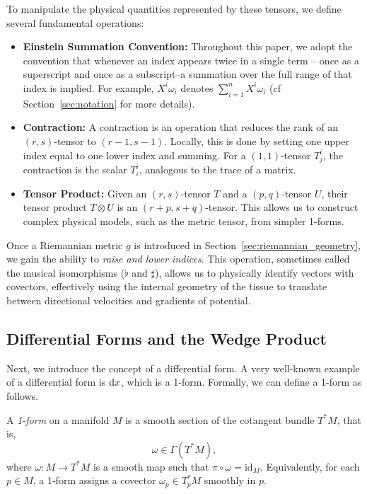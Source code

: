 To manipulate the physical quantities represented by these tensors, we define several fundamental operations:

\begin{itemize}
  \item \textbf{Einstein Summation Convention:} Throughout this paper, we adopt the convention that whenever an index appears twice in a single term -- once as a superscript and once as a subscript--a summation over the full range of that index is implied. For example, $X^i \omega_i$ denotes $\sum_{i=1}^n X^i \omega_i$ (cf Section~\ref{sec:notation} for more details).

  \item \textbf{Contraction:} A contraction is an operation that reduces the rank of an $(r,s)$-tensor to $(r-1, s-1)$. Locally, this is done by setting one upper index equal to one lower index and summing. For a $(1,1)$-tensor $T^i_j$, the contraction is the scalar $T^i_i$, analogous to the trace of a matrix.

  \item \textbf{Tensor Product:} Given an $(r,s)$-tensor $T$ and a $(p,q)$-tensor $U$, their tensor product $T \otimes U$ is an $(r+p, s+q)$-tensor. This allows us to construct complex physical models, such as the metric tensor, from simpler 1-forms.
\end{itemize}

\begin{note}
  Once a Riemannian metric $g$ is introduced in Section~\ref{sec:riemannian_geometry}, we gain the ability to \emph{raise and lower indices}. This operation, sometimes called the musical isomorphisms ($\flat$ and $\sharp$), allows us to physically identify vectors with covectors, effectively using the internal geometry of the tissue to translate between directional velocities and gradients of potential.
\end{note}

\subsection{Differential Forms and the Wedge Product} Next, we introduce the concept of a differential form. A very well-known example of a differential form is $\dx$, which is a 1-form. Formally, we can define a 1-form as follows.

\begin{definition}
  A \emph{1-form} on a manifold $M$ is a smooth section of the cotangent bundle $T^*M$, that is,
  \[%
    \omega \in \Gamma(T^*M)
  ,\]%
  where $\omega : M \to T^*M$ is a smooth map such that $\pi \circ \omega = \mathrm{id}_M$. Equivalently, for each $p \in M$, a 1-form assigns a covector $\omega_p \in T_p^*M$ smoothly in $p$.
\end{definition}


